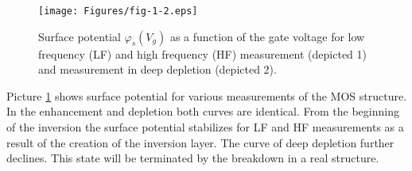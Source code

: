 \begin{figure}[h!]\centering
\texttt{[image: Figures/fig-1-2.eps]}
\captionsetup{justification=raggedright, singlelinecheck=false}
\iffalse
\caption[Priebeh povrchového potenciálu $\varphi_s(V_g)$ ako funkcie
  napätia hradla]{Priebeh povrchového potenciálu $\varphi_s(V_g)$ ako
  funkcie napätia hradla pre nízkofrekvenčné (LF) a vysokofrekvenčné
  (HF) meranie (označený 1) a pre meranie v stave hlbokého
  ochudobnenia (označený 2).}
\fi
\caption[Surface potential $\varphi_s(V_g)$ as a function of the gate
  voltage]{Surface potential $\varphi_s(V_g)$ as a function of the
  gate voltage for low frequency (LF) and high frequency (HF)
  measurement (depicted 1) and measurement in deep depletion (depicted
  2).}
\label{fig:1.2}
\end{figure}

\iffalse \par Na obrázku \ref{fig:1.2} sú znázornené priebehy
povrchového potenciálu pre rôzne režimy merania štruktúry MOS. V
oblasti obohatenia a ochudobnenia sú obidva priebehy rovnaké. Od
počiatku inverzie sa povrchový potenciál pre LF a HF meranie ustaľuje
v dôsledku vytvárania inverznej vrstvy.  Krivka hlbokého ochudobnenia
ďalej klesá. Tento stav sa v reálnej štruktúre ukončí elektrickým
prierazom.
\fi

\par Picture \ref{fig:1.2} shows surface potential for various
measurements of the MOS structure. In the enhancement and depletion
both curves are identical. From the beginning of the inversion the
surface potential stabilizes for LF and HF measurements as a result of
the creation of the inversion layer. The curve of deep depletion
further declines. This state will be terminated by the breakdown in a
real structure.

